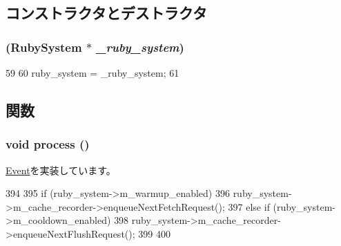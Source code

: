 \subsection{コンストラクタとデストラクタ}
\hypertarget{classRubySystem_1_1RubyEvent_a0d7af27651b7cc286549f123951f6de6}{
\subsubsection[{RubyEvent}]{ ({\bf RubySystem} $\ast$ {\em \_\-ruby\_\-system})}}
\label{classRubySystem_1_1RubyEvent_a0d7af27651b7cc286549f123951f6de6}



\begin{DoxyCode}
59         {
60             ruby_system = _ruby_system;
61         }
\end{DoxyCode}


\subsection{関数}
\hypertarget{classRubySystem_1_1RubyEvent_a2e9c5136d19b1a95fc427e0852deab5c}{
\subsubsection[{process}]{\setlength{\rightskip}{0pt plus 5cm}void process ()}}
\label{classRubySystem_1_1RubyEvent_a2e9c5136d19b1a95fc427e0852deab5c}


\hyperlink{classEvent_a142b75b68a6291400e20fb0dd905b1c8}{Event}を実装しています。


\begin{DoxyCode}
394 {
395     if (ruby_system->m_warmup_enabled) {
396         ruby_system->m_cache_recorder->enqueueNextFetchRequest();
397     }  else if (ruby_system->m_cooldown_enabled) {
398         ruby_system->m_cache_recorder->enqueueNextFlushRequest();
399     }
400 }
\end{DoxyCode}


